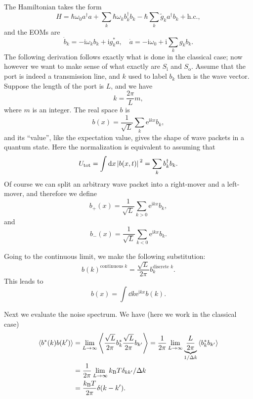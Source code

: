 \documentclass[hyperref, a4paper]{article}
\newcommand*{\ii}{\mathrm{i}}
\newcommand*{\ee}{\mathrm{e}}
\newcommand*{\kB}{k_{\text{B}}}
\newcommand*{\Si}{S_{\text{i}}}
\newcommand*{\So}{S_{\text{o}}}
\begin{document}
The Hamiltonian takes the form 
\begin{equation}
    H = \hbar \omega_0 a^\dag a + \sum_k \hbar \omega_k b_k^\dag b_k 
    - \hbar \sum_k \tilde{g}_k a^\dag b_{k} + \text{h.c.},
\end{equation}
and the EOMs are 
\begin{equation}
    \dot{b}_k = - \ii \omega_k b_k + \ii g_k^* a, \quad
    \dot{a} = - \ii \omega_0 + \ii \sum_k g_k b_k.
\end{equation}
The following derivation follows exactly what is done in the classical case; 
now however we want to make sense of what exactly are $\Si$ and $\So$.
Assume that the port is indeed a transmission line,
and $k$ used to label $b_k$ then is the wave vector.
Suppose the length of the port is $L$,
and we have 
\begin{equation}
    k = \frac{2\pi}{L} m, 
\end{equation}
where $m$ is an integer.
The real space $b$ is 
\begin{equation}
    b(x) = \frac{1}{\sqrt{L}} \sum_k \ee^{\ii k x} b_k,
\end{equation} 
and its ``value'', like the expectation value, 
gives the shape of wave packets in a quantum state.
Here the normalization is equivalent to assuming that 
\begin{equation}
    U_{\text{tot}} = \int \dd{x} \abs*{b(x, t)}^2 = \sum_k b^\dag_k b_k.
\end{equation}
Of course we can split an arbitrary wave packet into a right-mover and a left-mover,
and therefore we define 
\begin{equation}
    b_+(x) = \frac{1}{\sqrt{L}} \sum_{k>0} \ee^{\ii k x} b_k,
\end{equation}
and 
\begin{equation}
    b_-(x) = \frac{1}{\sqrt{L}} \sum_{k<0} \ee^{\ii k x} b_k.
\end{equation}

Going to the continuous limit, we make the following substitution:
\begin{equation}
    b(k)^{\text{continuous $k$}} = \frac{\sqrt{L}}{2\pi} b_k^{\text{discrete $k$}}.
\end{equation}
This leads to 
\begin{equation}
    b(x) = \int \dd{k} \ee^{\ii k x} b(k).
\end{equation}

Next we evaluate the noise spectrum. We have (here we work in the classical case)
\begin{equation}
    \begin{aligned}
        \expval{b^*(k) b(k')} &= \lim_{L \to \infty} \expval{
            \frac{\sqrt{L}}{2\pi} b_k^*
            \frac{\sqrt{L}}{2\pi} b_{k'} 
        } = \frac{1}{2\pi} \lim_{L \to \infty} \underbrace{\frac{L}{2\pi}}_{1 / \Delta k} \expval{b_k^* b_{k'}} \\
        &= \frac{1}{2\pi} \lim_{L \to \infty} \kB T \delta_{kk'} / \Delta k \\
        &= \frac{\kB T}{2\pi} \delta(k - k').
    \end{aligned}
\end{equation}
\end{document}
